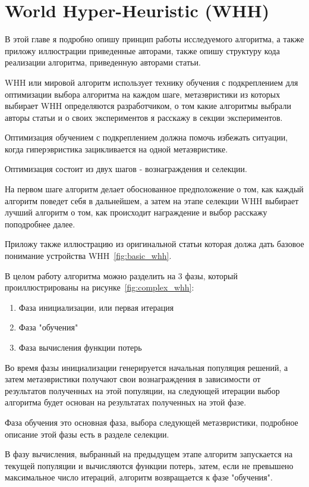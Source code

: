 \documentclass[a4paper,12pt]{extarticle}
\begin{document}
\section{World Hyper-Heuristic (WHH)}

В этой главе я подробно опишу принцип работы исследуемого алгоритма, а также приложу иллюстрации приведенные авторами, также опишу структуру кода реализации алгоритма, приведенную авторами статьи.

WHH или мировой алгоритм использует технику обучения с подкреплением для оптимизации выбора алгоритма на каждом шаге, метаэвристики из которых выбирает WHH определяются разработчиком, о том какие алгоритмы выбрали авторы статьи и о своих экспериментов я расскажу в секции экспериментов. 

Оптимизация обучением с подкреплением должна помочь избежать ситуации, когда гиперэвристика зацикливается на одной метаэвристике.

Оптимизация состоит из двух шагов - вознаграждения и селекции.

На первом шаге алгоритм делает обоснованное предположение о том, как каждый алгоритм поведет себя в дальнейшем, а затем на этапе селекции WHH выбирает лучший алгоритм о том, как происходит награждение и выбор расскажу поподробнее далее.

Приложу также иллюстрацию из оригинальной статьи которая должа дать базовое понимание устройства WHH~\ref{fig:basic_whh}. 

В целом работу алгоритма можно разделить на 3 фазы, который проиллюстрированы на рисунке~\ref{fig:complex_whh}: 

\begin{enumerate}
	\item Фаза инициализации, или первая итерация
	\item Фаза "обучения"
	\item Фаза вычисления функции потерь
\end{enumerate}

Во время фазы инициализации генерируется начальная популяция решений, а затем метаэвристики получают свои вознаграждения в зависимости от результатов полученных на этой популяции, на следующей итерации выбор алгоритма будет основан на результатах полученных на этой фазе.

Фаза обучения это основная фаза, выбора следующей метаэвристики, подробное описание этой фазы есть в разделе селекции.

В фазу вычисления, выбранный на предыдущем этапе алгоритм запускается на текущей популяции и вычисляются функции потерь, затем, если не превышено максимальное число итераций, алгоритм возвращается к фазе "обучения".
\end{document}

